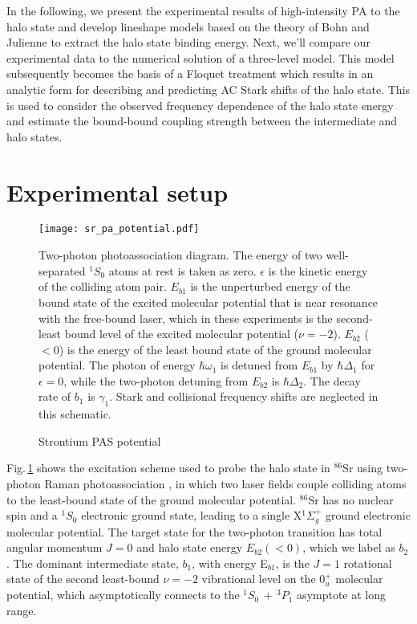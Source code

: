 In the following, we present the experimental results of high-intensity PA to the halo state and develop lineshape models based on the theory of Bohn and Julienne to extract the halo state binding energy.
Next, we'll compare our experimental data to the numerical solution of a three-level model.
This model subsequently becomes the basis of a Floquet treatment which results in an analytic form for describing and predicting AC Stark shifts of the halo state.
This is used to consider the observed frequency dependence of the halo state energy and estimate the bound-bound coupling strength between the intermediate and halo states.

\section{Experimental setup} \label{sec:highE_methods}
	\begin{figure} 
	\centerline{
	  \texttt{[image: sr\_pa\_potential.pdf]}}
	  \caption{Strontium PAS potential}{Two-photon photoassociation diagram. The energy of two well-separated $^1S_0$ atoms at rest is taken as zero. $\epsilon$ is the kinetic energy of the colliding atom pair. $E_{b1}$ is the unperturbed energy of the bound state of the excited molecular potential that is near resonance with the free-bound laser, which in these experiments is the second-least bound level of the excited molecular potential ($\nu=-2$). $E_{b2}$ ($<0$) is the energy of the least bound state of the ground molecular potential. The photon of energy $\hbar \omega_1$ is detuned from $E_{b1}$ by $\hbar \Delta_1$ for $\epsilon=0$, while the two-photon detuning from $E_{b2}$ is $\hbar \Delta_2$. The decay rate of $b_1$ is $\gamma_1$. Stark and collisional frequency shifts are neglected in this schematic.}
	  \label{fig:PASDiagram}
	\end{figure}
Fig.\,\ref{fig:PASDiagram} shows the excitation scheme used to probe the halo state in $^{86}$Sr using two-photon Raman photoassociation \cite{jtl06}, in which two laser fields couple colliding atoms to the least-bound state of the ground molecular potential. 
$^{86}$Sr has no nuclear spin and a $^1S_0$ electronic ground state, leading to a single X$^1\Sigma_g^+$ ground electronic molecular potential.
The target state for the two-photon transition has total angular momentum $J=0$ and halo state energy $E_{b2}(<0)$, which we label as $b_2$.
The dominant intermediate state, $b_1$, with energy E$_{b1}$, is the $J=1$ rotational state of the second least-bound $\nu=-2$ vibrational level on the $0^+_u$ molecular potential, which asymptotically connects to the $^1S_0\,+\,^3P_1$ asymptote at long range\cite{mmp08}.
